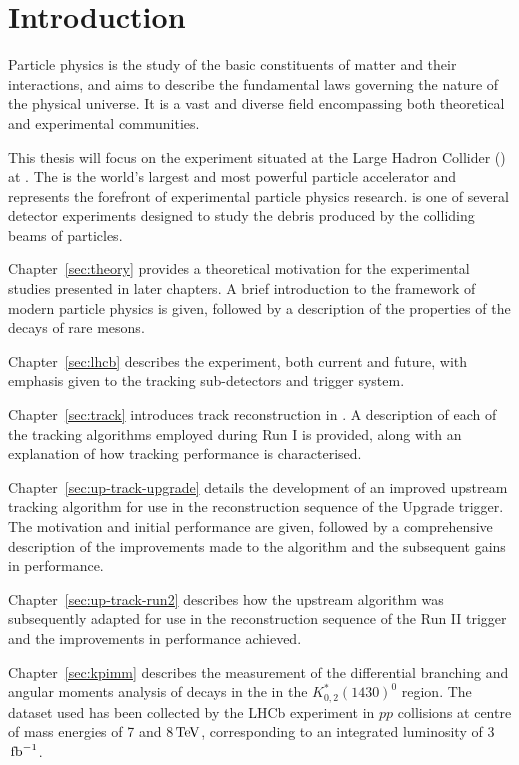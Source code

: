 \section{Introduction}
\label{sec:intro}

Particle physics is the study of the basic constituents of matter and their interactions, and aims to describe the fundamental laws governing the nature of the physical universe. It is a vast and diverse field encompassing both theoretical and experimental communities.

This thesis will focus on the \lhcb experiment situated at the Large Hadron Collider (\lhc) at \cern. The \lhc is the world's largest and most powerful particle accelerator and represents the forefront of experimental particle physics research. \lhcb is one of several detector experiments designed to study the debris produced by the colliding beams of particles.

Chapter~\ref{sec:theory} provides a theoretical motivation for the experimental studies presented in later chapters. A brief introduction to the framework of modern particle physics is given, followed by a description of the properties of the decays of rare \B mesons.

Chapter~\ref{sec:lhcb} describes the \lhcb experiment, both current and future, with emphasis given to the tracking sub-detectors and trigger system.

Chapter~\ref{sec:track} introduces track reconstruction in \lhcb. A description of each of the tracking algorithms employed during \lhcb Run I is provided, along with an explanation of how tracking performance is characterised.

Chapter~\ref{sec:up-track-upgrade} details the development of an improved upstream tracking algorithm for use in the reconstruction sequence of the \lhcb Upgrade trigger. The motivation and initial performance are given, followed by a comprehensive description of the improvements made to the algorithm and the subsequent gains in performance. 

Chapter~\ref{sec:up-track-run2} describes how the upstream algorithm was subsequently adapted for use in the reconstruction sequence of the \lhcb Run II trigger and the improvements in performance achieved.

Chapter~\ref{sec:kpimm} describes the measurement of the differential branching and angular moments analysis of \BdToKpimm decays in the in the $K^{*}_{0,2}(1430)^{0}$ region. The dataset used has been collected by the LHCb experiment in $pp$ collisions at centre of mass energies of 7 and 8${\mathrm{\,Te\kern -0.1em V}}$, corresponding to an integrated luminosity of 3$\mbox{\,fb}^{-1}$.